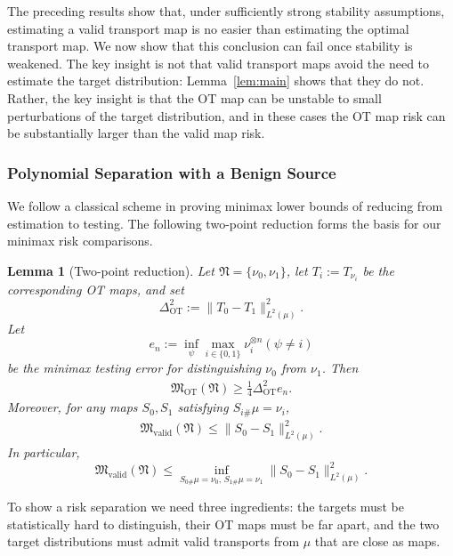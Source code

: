 \documentclass[11pt,twoside]{article}
\newtheorem{lemma}{Lemma}
\newcommand{\OT}{\mathrm{OT}}
\newcommand{\targetclass}{\mathfrak{N}}
\newcommand{\validminimaxrisk}{\mathfrak{M}_{\text{valid}}}
\newcommand{\otminimaxrisk}{\mathfrak{M}_{\text{OT}}}
\begin{document}
The preceding results show that, under sufficiently strong stability assumptions, estimating a valid transport map is no easier than estimating the optimal transport map. We now show that this conclusion can fail once stability is weakened. The key insight is not that valid transport maps avoid the need to estimate the target distribution: Lemma~\ref{lem:main} shows that they do not. Rather, the key insight is that the OT map can be unstable to small perturbations of the target distribution, and in these cases the OT map risk can be substantially larger than the valid map risk.

\subsubsection{Polynomial Separation with a Benign Source}
We follow a classical scheme in proving minimax lower bounds of reducing from estimation to testing.
The following two-point reduction forms the basis for our minimax risk comparisons.
\begin{lemma}[Two-point reduction]
\label{lem:twopoint-separation}
Let $\targetclass=\{\nu_0,\nu_1\}$, let $T_i:=T_{\nu_i}$ be the corresponding OT maps, and set
\[
\Delta_{\OT}^2:=\|T_0-T_1\|_{L^2(\mu)}^2.
\]
Let
\[
e_n:=\inf_\psi \max_{i\in\{0,1\}}
\nu_i^{\otimes n}(\psi\neq i)
\]
be the minimax testing error for distinguishing $\nu_0$ from $\nu_1$. Then
\begin{align}
\label{eq:twopoint-ot-lower}
\otminimaxrisk(\targetclass)
\geq
\frac{1}{4}\Delta_{\OT}^2 e_n.
\end{align}
Moreover, for any maps $S_0,S_1$ satisfying $S_{i\#}\mu=\nu_i$,
\begin{align}
\label{eq:twopoint-valid-upper}
\validminimaxrisk(\targetclass)
\leq
\|S_0-S_1\|_{L^2(\mu)}^2.
\end{align}
In particular,
\[
\validminimaxrisk(\targetclass)
\leq
\inf_{S_{0\#}\mu=\nu_0,\,S_{1\#}\mu=\nu_1}
\|S_0-S_1\|_{L^2(\mu)}^2.
\]
\end{lemma}
\noindent To show a risk separation we need three ingredients: the targets must be statistically hard to distinguish, their OT maps must be far apart, and the two target distributions must admit valid transports from $\mu$ that are close as maps.
\end{document}
